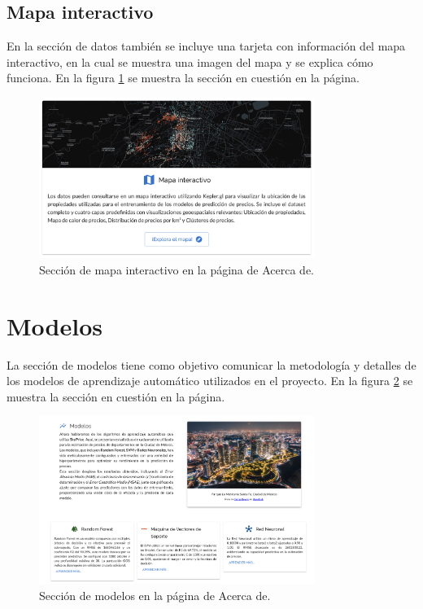 \subsection{Mapa interactivo}
En la sección de datos también se incluye una tarjeta con información del mapa
interactivo, en la cual se muestra una imagen del mapa y se explica cómo
funciona. En la figura \ref{fig:mapa} se muestra la sección en cuestión en la
página.

\begin{figure}[H]
  \centering
  \includegraphics[width=0.8\textwidth]{imagenes/04-acerca-de/mapa.png}
  \caption{Sección de mapa interactivo en la página de Acerca de.}
  \label{fig:mapa}
\end{figure}

\section{Modelos}
La sección de modelos tiene como objetivo comunicar la metodología y detalles
de los modelos de aprendizaje automático utilizados en el proyecto. En la figura
\ref{fig:modelos} se muestra la sección en cuestión en la página.

\begin{figure}[H]
  \centering
  \includegraphics[width=0.8\textwidth]{imagenes/04-acerca-de/modelos.png}
  \caption{Sección de modelos en la página de Acerca de.}
  \label{fig:modelos}
\end{figure}

